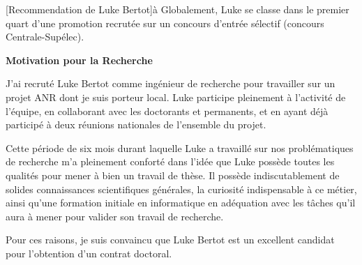 \documentclass[a4paper,10pt]{article}
\begin{document}
\begin{letter}[Recommendation de Luke Bertot]{à}
Globalement, Luke se classe dans le premier quart d'une promotion recrutée sur
un concours d'entrée sélectif (concours Centrale-Supélec).


\textbf{Motivation pour la Recherche}

J'ai recruté  Luke Bertot comme  ingénieur de  recherche pour travailler  sur un
projet ANR dont je suis porteur local. Luke participe pleinement à l'activité de
l'équipe, en  collaborant avec les  doctorants et  permanents, et en  ayant déjà
participé à deux réunions nationales de l'ensemble du projet.

Cette  période   de  six  mois  durant   laquelle  Luke  a  travaillé   sur  nos
problématiques de recherche m'a pleinement conforté dans l'idée que Luke possède
toutes  les  qualités  pour mener  à  bien  un  travail  de thèse.   Il  possède
indiscutablement de solides connaissances  scientifiques générales, la curiosité
indispensable à  ce métier, ainsi  qu'une formation initiale en  informatique en
adéquation  avec les  tâches qu'il  aura  à mener  pour valider  son travail  de
recherche.


Pour ces raisons, je suis convaincu que Luke Bertot est un excellent candidat
pour l'obtention d'un contrat doctoral.




\end{letter}
\begin{flushright}
\end{flushright}
\end{document}
